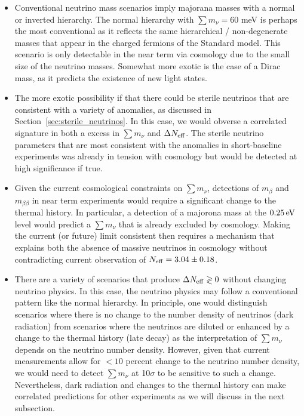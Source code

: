 \begin{itemize}
\item Conventional neutrino mass scenarios imply majorana masses with a normal or inverted hierarchy.  The normal hierarchy with $\sum m_\nu = 60$ meV is perhaps the most conventional as it reflects the same hierarchical / non-degenerate masses that appear in the charged fermions of the Standard model.  This scenario is only detectable in the near term via cosmology due to the small size of the neutrino masses.  Somewhat more exotic is the case of a Dirac mass, as it predicts the existence of new light states.

\item The more exotic possibility if that there could be sterile neutrinos that are consistent with a variety of anomalies, as discussed in Section~\ref{sec:sterile_neutrinos}.  In this case, we would obverse a correlated signature in both a excess in $\sum m_\nu$ and $\Delta N_{\rm eff}$.  The sterile neutrino parameters that are most consistent with the anomalies in short-baseline experiments was already in tension with cosmology but would be detected at high significance if true.  

\item Given the current cosmological constraints on $\sum m_\nu$, detections of $m_\beta$ and $m_{\beta \beta}$ in near term experiments would require a significant change to the thermal history.  In particular, a detection of a majorona mass at the $0.25 \, {\rm eV}$ level would predict a $\sum m_\nu$ that is already excluded by cosmology.  Making the current (or future) limit consistent then requires a mechanism that explains both the absence of massive neutrinos in cosmology without contradicting current observation of $N_{\rm eff} = 3.04 \pm 0.18$.


\item There are a variety of scenarios that produce $\Delta N_{\rm eff}  \gtrless 0$ without changing neutrino physics.  In this case, the neutrino physics may follow a conventional pattern like the normal hierarchy.  In principle, one would distinguish scenarios where there is no change to the number density of neutrinos (dark radiation) from scenarios where the neutrinos are diluted or enhanced by a change to the thermal history (late decay) as the interpretation of $\sum m_\nu$ depends on the neutrino number density.  However, given that current measurements allow for $< 10$ percent change to the neutrino number density, we would need to detect $\sum m_\nu$ at 10$\sigma$ to be sensitive to such a change.  Nevertheless, dark radiation and changes to the thermal history can make correlated predictions for other experiments as we will discuss in the next subsection.
\end{itemize}
